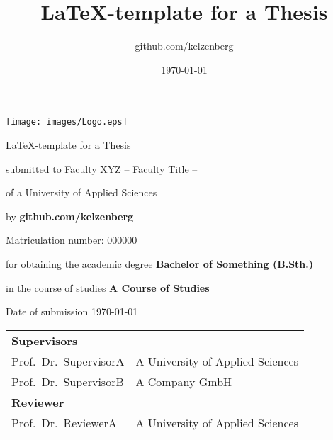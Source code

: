 \begin{titlepage}
  \newcommand{\getTitle}{\LaTeX-template for a Thesis}
  \title{\getTitle}
  \author{github.com/kelzenberg}
  \date{\today}

  \begin{center}

    \texttt{[image: images/Logo.eps]}

    \vfill

    \huge \getTitle

    \vfill

    

    \normalsize submitted to Faculty XYZ – Faculty Title –

    of a University of Applied Sciences

    \vspace{1em}

    by \textbf{github.com/kelzenberg}

    Matriculation number: 000000

    \vspace{1em}

    \normalsize for obtaining the academic degree \textbf{Bachelor of Something (B.Sth.)}
    
    in the course of studies \textbf{A Course of Studies}

    \vfill

    \normalsize Date of submission \today

  \end{center}

  \vfill

  \noindent\begin{tabular}{ll}
    \multicolumn{2}{l}{\textbf{Supervisors}}                       \\
    Prof.~Dr.~SupervisorA         & A University of Applied Sciences \\
    Prof.~Dr.~SupervisorB         & A Company GmbH                   \\[1em]
    \multicolumn{2}{l}{\textbf{Reviewer}}                          \\
    Prof.~Dr.~ReviewerA           & A University of Applied Sciences
  \end{tabular}

\end{titlepage}

\cleardoublepage